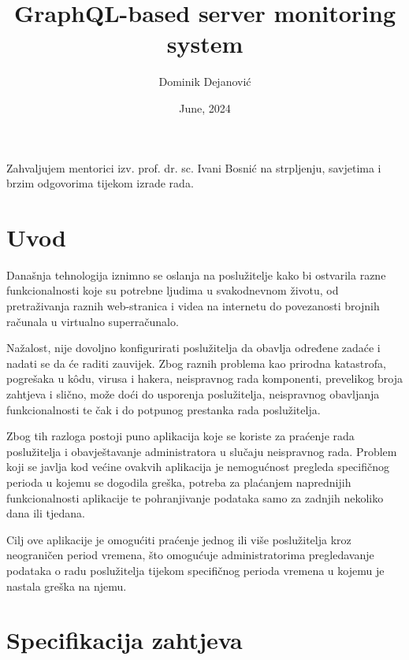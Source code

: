 \documentclass[zavrsnirad]{fer}
\title{GraphQL-based server monitoring system}
\author{Dominik Dejanović}
\date{June, 2024}
\begin{document}

\begin{zahvale}
Zahvaljujem mentorici izv. prof. dr. sc. Ivani Bosnić na strpljenju, savjetima i brzim odgovorima tijekom izrade rada.
\end{zahvale}


\mainmatter


\tableofcontents


\chapter{Uvod}
\label{pog:uvod}
Današnja tehnologija iznimno se oslanja na poslužitelje kako bi ostvarila razne funkcionalnosti koje su potrebne ljudima u svakodnevnom životu, od pretraživanja raznih web-stranica i videa na internetu do povezanosti brojnih računala u virtualno superračunalo. 

Nažalost, nije dovoljno konfigurirati poslužitelja da obavlja određene zadaće i nadati se da će raditi zauvijek. Zbog raznih problema kao prirodna katastrofa, pogrešaka u kôdu, virusa i hakera, neispravnog rada komponenti, prevelikog broja zahtjeva i slično, može doći do usporenja poslužitelja, neispravnog obavljanja funkcionalnosti te čak i do potpunog prestanka rada poslužitelja.

Zbog tih razloga postoji puno aplikacija koje se koriste za praćenje rada poslužitelja i obavještavanje administratora u slučaju neispravnog rada. Problem koji se javlja kod većine ovakvih aplikacija je nemogućnost pregleda specifičnog perioda u kojemu se dogodila greška, potreba za plaćanjem naprednijih funkcionalnosti aplikacije te pohranjivanje podataka samo za zadnjih nekoliko dana ili tjedana.

Cilj ove aplikacije je omogućiti praćenje jednog ili više poslužitelja kroz neograničen period vremena, što omogućuje administratorima pregledavanje podataka o radu poslužitelja tijekom specifičnog perioda vremena u kojemu je nastala greška na njemu.


\chapter{Specifikacija zahtjeva}
\label{pog:specifikacija_zahtjeva}
\end{document}
